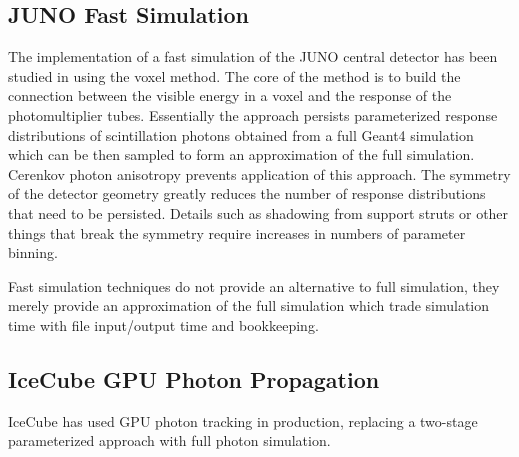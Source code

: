 \documentclass[a4paper]{jpconf}
\begin{document}
\subsection{JUNO Fast Simulation}

The implementation of a fast simulation of the JUNO central detector has 
been studied in\cite{junoFastSim} using the voxel method. The core
of the method is to build the connection between the visible energy
in a voxel and the response of the photomultiplier tubes.
Essentially the approach persists parameterized response distributions 
of scintillation photons obtained from a full Geant4 simulation which 
can be then sampled to form an approximation of the full simulation.
Cerenkov photon anisotropy prevents application of this approach.
The symmetry of the detector geometry greatly reduces the number of 
response distributions that need to be persisted. Details such as 
shadowing from support struts or other things that break the symmetry 
require increases in numbers of parameter binning.  

Fast simulation techniques do not provide an alternative to full simulation, 
they merely provide an approximation of the full simulation which trade 
simulation time with file input/output time and bookkeeping. 
  
\subsection{IceCube GPU Photon Propagation}

IceCube\cite{IceCubeGPU} has used GPU photon tracking in production, replacing 
a two-stage parameterized approach with full photon simulation. 



\end{document}
